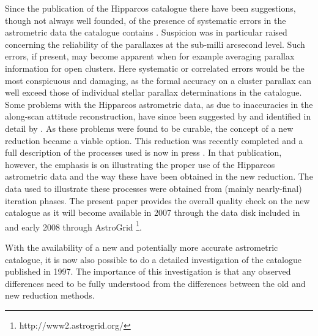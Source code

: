 \documentclass{aa}
\begin{document}
Since the publication of the Hipparcos catalogue \citep{esa97} there have 
been suggestions, though not always well founded, of the presence of 
systematic errors in the astrometric data the catalogue contains 
\citep[see for example:][]{naray99, soder05}. Suspicion was in particular 
raised concerning the 
reliability of the parallaxes at the sub-milli arcsecond level. Such errors, 
if present, may become apparent when for example averaging parallax 
information for open clusters. Here systematic or correlated errors would 
be the most conspicuous and damaging, as the formal accuracy on a cluster 
parallax can well exceed those of individual stellar parallax determinations 
in the catalogue. Some problems with the Hipparcos astrometric data, as
due to inaccuracies in the along-scan attitude reconstruction, have 
since been suggested by \citet{makar02} and identified in detail by 
\citet{fvl05a}. As these problems were found to be 
curable, the concept of a new reduction \citep{fvl05b} became a viable option. 
This reduction was recently completed and a full description of the processes 
used is now in press \citep{fvl07}. In that 
publication, however, the emphasis is on illustrating the proper use of 
the Hipparcos astrometric data and the way these have been obtained in the 
new reduction. The data used to illustrate these processes were obtained from
(mainly nearly-final) iteration phases. The present paper provides the overall
quality check on the new catalogue as it will become available in 2007 through
the data disk included in \citep{fvl07} and early 2008 through AstroGrid
\footnote{http://www2.astrogrid.org/}.

With the availability of a new and potentially more accurate astrometric 
catalogue, it is now also possible to do a detailed investigation of the
catalogue published in 1997. The importance of this investigation is that
any observed differences need to be fully understood from the differences
between the old and new reduction methods.
\end{document}
